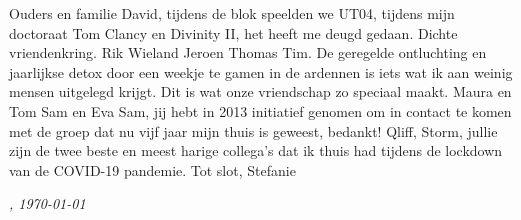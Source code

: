 \documentclass[\home/main.tex]{subfiles}
\begin{document}
Ouders en familie 
David, tijdens de blok speelden we UT04, tijdens mijn doctoraat Tom Clancy en Divinity II, het heeft me deugd gedaan. 
Dichte vriendenkring. Rik Wieland Jeroen Thomas Tim. De geregelde ontluchting en jaarlijkse detox door een weekje te gamen in de ardennen is iets wat ik aan weinig mensen uitgelegd krijgt. Dit is wat onze vriendschap zo speciaal maakt. 
Maura en Tom
Sam en Eva 
Sam, jij hebt in 2013 initiatief genomen om in contact te komen met de groep dat nu vijf jaar mijn thuis is geweest, bedankt!
Qliff, Storm, jullie zijn de twee beste en meest harige collega's dat ik thuis had tijdens de lockdown van de COVID-19 pandemie. Tot slot, Stefanie 

\vspace{1cm}

\begin{flushright}
\textit{\theauthor, \today}
\end{flushright}
\end{document}
